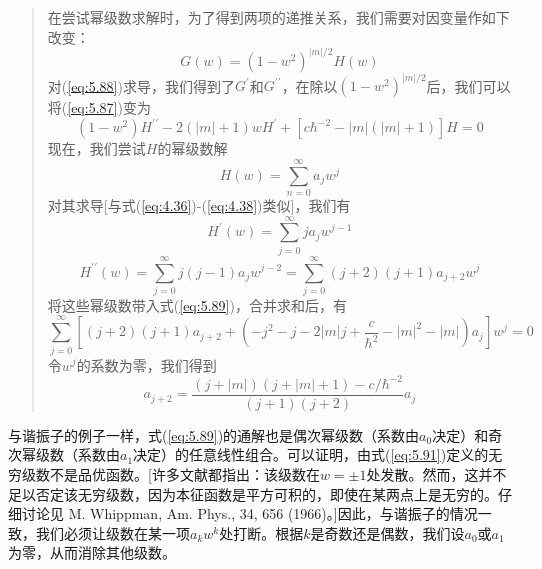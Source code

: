 \begin{quote}
        在尝试幂级数求解时，为了得到两项的递推关系，我们需要对因变量作如下改变：
        \begin{equation}
            G\left(w\right) = \left(1-w^2\right)^{\left|m\right|/2}H\left(w\right)
            \label{eq:5.88}
        \end{equation}
        对(\ref{eq:5.88})求导，我们得到了$G^{\prime}$和$G^{\prime\prime}$，在除以$\left(1-w^2\right)^{\left|m\right|/2}$后，我们可以将(\ref{eq:5.87})变为
        \begin{equation}
            \left(1-w^2\right)H^{\prime\prime} - 2\left(\left|m\right|+1\right)wH^{\prime} + \left[c\hbar^{-2}-\left|m\right|\left(\left|m\right|+1\right)\right]H = 0
            \label{eq:5.89}
        \end{equation}
        现在，我们尝试$H$的幂级数解
        \begin{equation}
            H\left(w\right) = \sum_{n=0}^{\infty}a_jw^j
            \label{eq:5.90}
        \end{equation}
        对其求导[与式(\ref{eq:4.36})-(\ref{eq:4.38})类似]，我们有
        \begin{equation*}
            H^{\prime}\left(w\right) = \sum_{j=0}^{\infty}ja_jw^{j-1}
        \end{equation*}
        \begin{equation*}
            H^{\prime\prime}\left(w\right) = \sum_{j=0}^{\infty}j(j-1)a_jw^{j-2} = \sum_{j=0}^{\infty}\left(j+2\right)\left(j+1\right)a_{j+2}w^{j}
        \end{equation*}
        将这些幂级数带入式(\ref{eq:5.89})，合并求和后，有
        \begin{equation*}
            \sum_{j=0}^{\infty}\left[\left(j+2\right)\left(j+1\right)a_{j+2}+\left(-j^2-j-2\left|m\right|j+\frac{c}{\hbar^2}-\left|m\right|^2-\left|m\right|\right)a_j\right]w^j=0
        \end{equation*}
        令$w^j$的系数为零，我们得到
        \begin{equation}
            a_{j+2} = \frac{\left(j+\left|m\right|\right)\left(j+\left|m\right|+1\right)-c/\hbar^{-2}}{\left(j+1\right)\left(j+2\right)}a_j
            \label{eq:5.91}
        \end{equation}
    \end{quote}

    与谐振子的例子一样，式(\ref{eq:5.89})的通解也是偶次幂级数（系数由$a_0$决定）和奇次幂级数（系数由$a_1$决定）的任意线性组合。可以证明，由式(\ref{eq:5.91})定义的无穷级数不是品优函数。[许多文献都指出：该级数在$w = \pm 1$处发散。然而，这并不足以否定该无穷级数，因为本征函数是平方可积的，即使在某两点上是无穷的。仔细讨论见 M. Whippman, Am. Phys., 34, 656 (1966)。]因此，与谐振子的情况一致，我们必须让级数在某一项$a_kw^k$处打断。根据$k$是奇数还是偶数，我们设$a_0$或$a_1$为零，从而消除其他级数。


